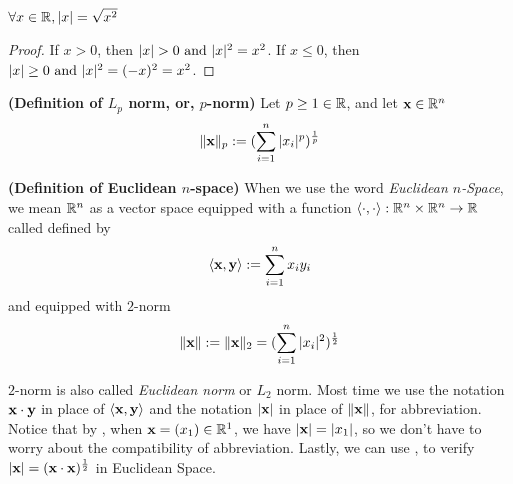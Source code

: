\documentclass{report}
\begin{document}
\begin{theorem}
\label{1.5.3}
$\forall x\in\mathbb{R},|x|=\sqrt{x^2} $
\end{theorem}
\begin{proof}
If $x>0$, then  $\abso{x}>0\text{ and }\abso{x}^2=x^2$. If $x\leq 0$, then $|x|\geq 0\text{ and }|x|^2=(-x)^2=x^2$. 
\end{proof}
\begin{definition}
\label{1.5.4}
\textbf{(Definition of $L_p$ norm, or, $p$-norm)} Let $p\geq 1\in\mathbb{R}$, and let $\textbf{x}\in\mathbb{R}^n$
\begin{equation}
\| \textbf{x} \|_p:=(\sum_{i=1}^{n}|x_i|^p)^{\frac{1}{p}} 
\end{equation}
\end{definition}
\begin{definition}
\label{1.5.5}
\textbf{(Definition of Euclidean $n$-space)}
When we use the word \textit{Euclidean $n$-Space}, we mean $\mathbb{R}^n$ as a vector space equipped with a function $\langle \cdot,\cdot \rangle:\mathbb{R}^n\times\mathbb{R}^n\rightarrow \mathbb{R}$ called  defined by
\begin{equation}
\langle \textbf{x},\textbf{y} \rangle:=\sum_{i=1}^{n}x_iy_i
\end{equation}
and equipped with $2$-norm
\begin{equation}
\| \textbf{x} \|:=\| \textbf{x} \|_2=(\sum_{i=1}^{n}|x_i|^2)^{\frac{1}{2}} 
\end{equation}

$2$-norm is also called \textit{Euclidean norm}  or  $L_2$ norm. Most time we use the notation $\textbf{x}\cdot\textbf{y}$ in place of $\langle \textbf{x},\textbf{y} \rangle$  and the notation $|\textbf{x}|$ in place of $\| \textbf{x} \|$, for abbreviation. Notice that by , when $\textbf{x}=(x_1)\in\mathbb{R}^1$, we have $|\textbf{x}|=|x_1|$, so we don't have to worry about the compatibility of abbreviation.  Lastly, we can use , to verify $|\textbf{x}|=(\textbf{x}\cdot\textbf{x})^{\frac{1}{2}}$ in Euclidean Space. 
\end{definition}
\end{document}
